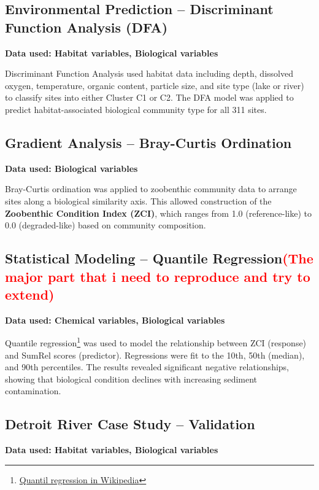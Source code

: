 \subsection*{Environmental Prediction – Discriminant Function Analysis (DFA)}
\textbf{Data used: Habitat variables, Biological variables}

Discriminant Function Analysis used habitat data including depth, dissolved oxygen, temperature, organic content, particle size, and site type (lake or river) to classify sites into either Cluster C1 or C2. The DFA model was applied to predict habitat-associated biological community type for all 311 sites.

\subsection*{Gradient Analysis – Bray-Curtis Ordination}
\textbf{Data used: Biological variables}

Bray-Curtis ordination was applied to zoobenthic community data to arrange sites along a biological similarity axis. This allowed construction of the \textbf{Zoobenthic Condition Index (ZCI)}, which ranges from 1.0 (reference-like) to 0.0 (degraded-like) based on community composition.

\subsection*{Statistical Modeling – Quantile Regression\textcolor{red}{(The major part that i need to reproduce and try to extend)}}
\textbf{Data used: Chemical variables, Biological variables}

Quantile regression\footnote{\href{https://en.wikipedia.org/wiki/Quantile_regression}{Quantil regression in Wikipedia}}
 was used to model the relationship between ZCI (response) and SumRel scores (predictor). 
Regressions were fit to the 10th, 50th (median), and 90th percentiles.
 The results revealed significant negative relationships, showing that biological condition
  declines with increasing sediment contamination.

\subsection*{Detroit River Case Study – Validation}
\textbf{Data used: Habitat variables, Biological variables}

